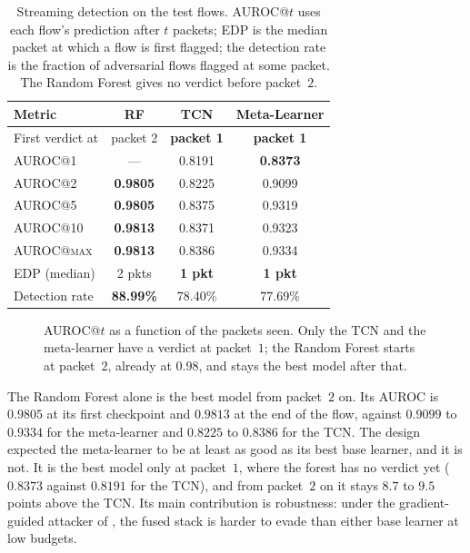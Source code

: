 \begin{table}[t]
\centering
\caption[Streaming detection]{Streaming detection on the test flows. AUROC@$t$ uses each
flow's prediction after $t$ packets; EDP is the median packet at which a flow is first
flagged; the detection rate is the fraction of adversarial flows flagged at some packet.
The Random Forest gives no verdict before packet~$2$.}
\label{tab:eval-streaming}
\begin{tabular}{lccc}
\toprule
\textbf{Metric} & \textbf{RF} & \textbf{TCN} & \textbf{Meta-Learner} \\
\midrule
First verdict at    & packet 2        & \textbf{packet 1} & \textbf{packet 1} \\
AUROC@1             & ---             & 0.8191          & \textbf{0.8373} \\
AUROC@2             & \textbf{0.9805} & 0.8225          & 0.9099 \\
AUROC@5             & \textbf{0.9805} & 0.8375          & 0.9319 \\
AUROC@10            & \textbf{0.9813} & 0.8371          & 0.9323 \\
AUROC@\textsc{max}  & \textbf{0.9813} & 0.8386          & 0.9334 \\
EDP (median)        & 2 pkts          & \textbf{1 pkt}  & \textbf{1 pkt} \\
Detection rate      & \textbf{88.99\%} & 78.40\%        & 77.69\% \\
\bottomrule
\end{tabular}
\end{table}

\begin{figure}[t]
    \centering
    
    \caption[Streaming AUROC@$t$.]{AUROC@$t$ as a function of the packets seen. Only the
    TCN and the meta-learner have a verdict at packet~$1$; the Random Forest starts at
    packet~$2$, already at $0.98$, and stays the best model after that.}
    \label{fig:eval-streaming}
\end{figure}

The Random Forest alone is the best model from packet~$2$ on. Its AUROC is $0.9805$ at
its first checkpoint and $0.9813$ at the end of the flow, against $0.9099$ to $0.9334$
for the meta-learner and $0.8225$ to $0.8386$ for the \ac{TCN}. The design expected the
meta-learner to be at least as good as its best base learner, and it is not. It is the
best model only at packet~$1$, where the forest has no verdict yet ($0.8373$ against
$0.8191$ for the \ac{TCN}), and from packet~$2$ on it stays $8.7$ to $9.5$ points above
the \ac{TCN}. Its main contribution is robustness: under the gradient-guided attacker of
, the fused stack is harder to evade than either base learner
at low budgets.

